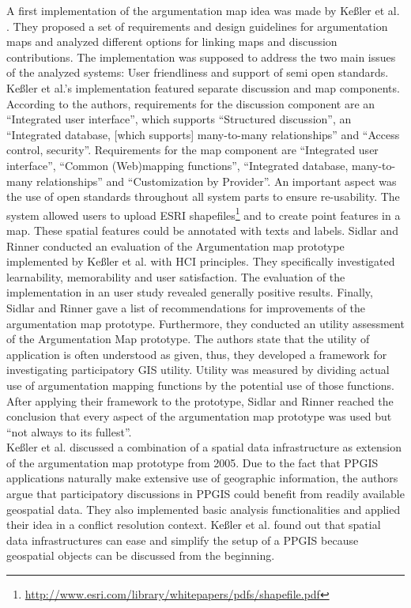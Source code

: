 A first implementation of the argumentation map idea was made  by Ke{\ss}ler et al. \cite{Kessler2005_ArgumentationMapPrototype}. They proposed a set of requirements and design guidelines for argumentation maps and analyzed different options for linking maps and discussion contributions. The implementation was supposed to address the two main issues of the analyzed systems: User friendliness and support of semi open standards. Ke{\ss}ler et al.'s implementation featured separate discussion and map components. According to the authors, requirements for the discussion component are an ``Integrated user interface'', which supports ``Structured discussion'', an ``Integrated database, [which supports] many-to-many relationships'' and ``Access control, security''. Requirements for the map component are ``Integrated user interface'', ``Common (Web)mapping functions'', ``Integrated database, many-to-many relationships'' and ``Customization by Provider''. An important aspect was the use of open standards throughout all system parts to ensure re-usability. The system allowed users to upload ESRI shapefiles\footnote{\url{http://www.esri.com/library/whitepapers/pdfs/shapefile.pdf}} and to create point features in a map. These spatial features could be annotated with texts and labels. Sidlar and Rinner \cite{sidlar_argumap_2007} conducted an evaluation of the Argumentation map prototype implemented by Ke{\ss}ler et al. with HCI principles. They specifically investigated learnability, memorability and user satisfaction. The evaluation of the implementation in an user study revealed generally positive results. Finally, Sidlar and Rinner gave a list of recommendations for improvements of the argumentation map prototype. Furthermore, they conducted an utility assessment \cite{Sidlar2009-AssessmentMapGeocollaborationTool} of the Argumentation Map prototype. The authors state that the utility of application is often understood as given, thus, they developed a framework for investigating participatory GIS utility. Utility was measured by dividing actual use of argumentation mapping functions by the potential use of those functions. After applying their framework to the prototype, Sidlar and Rinner reached the conclusion that every aspect of the argumentation map prototype was used but ``not always to its fullest''. \\
Ke{\ss}ler et al. \cite{Kessler2005_Conflict_Resolution} discussed a combination of a spatial data infrastructure as extension of the argumentation map prototype from 2005. Due to the fact that PPGIS applications naturally make extensive use of geographic information, the authors argue that participatory discussions in PPGIS could benefit from readily available geospatial data. They also implemented basic analysis functionalities and applied their idea in a conflict resolution context. Ke{\ss}ler et al. found out that spatial data infrastructures can ease and simplify the setup of a PPGIS because geospatial objects can be discussed from the beginning.\\
